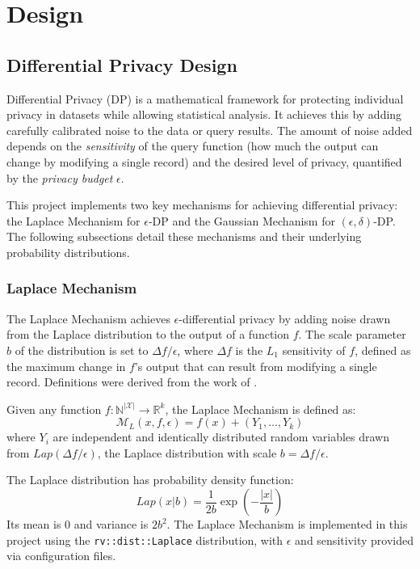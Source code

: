\chapter{Design\label{chap:design}}
\section{Differential Privacy Design}
Differential Privacy (DP) is a mathematical framework for protecting individual privacy in datasets while allowing statistical analysis. It achieves this by adding carefully calibrated noise to the data or query results. The amount of noise added depends on the \textit{sensitivity} of the query function (how much the output can change by modifying a single record) and the desired level of privacy, quantified by the \textit{privacy budget} $\epsilon$. 

This project implements two key mechanisms for achieving differential privacy: the Laplace Mechanism for $\epsilon$-DP and the Gaussian Mechanism for $(\epsilon, \delta)$-DP. The following subsections detail these mechanisms and their underlying probability distributions.

\subsection{Laplace Mechanism}
The Laplace Mechanism achieves $\epsilon$-differential privacy by adding noise drawn from the Laplace distribution to the output of a function $f$. The scale parameter $b$ of the distribution is set to $\Delta f / \epsilon$, where $\Delta f$ is the $L_1$ sensitivity of $f$, defined as the maximum change in $f$'s output that can result from modifying a single record. Definitions were derived from the work of \citet{Dwork2014}.

\begin{definition}
Given any function $f: \mathbb{N}^{|\mathcal{X}|} \rightarrow \mathbb{R}^k$, the Laplace Mechanism is defined as:
\begin{equation}
\mathcal{M}_L(x, f, \epsilon) = f(x) + (Y_1, \ldots, Y_k)
\end{equation}
where $Y_i$ are independent and identically distributed random variables drawn from $Lap(\Delta f/\epsilon)$, the Laplace distribution with scale $b = \Delta f/\epsilon$\citep[Def. 3.3]{Dwork2014}.
\end{definition}

The Laplace distribution has probability density function:
\begin{equation}
Lap(x | b) = \frac{1}{2b} \exp\left(-\frac{|x|}{b}\right) 
\end{equation}
Its mean is 0 and variance is $2b^2$\citep[Def. 3.2]{Dwork2014}. The Laplace Mechanism is implemented in this project using the \texttt{rv::dist::Laplace} distribution, with $\epsilon$ and sensitivity provided via configuration files.

